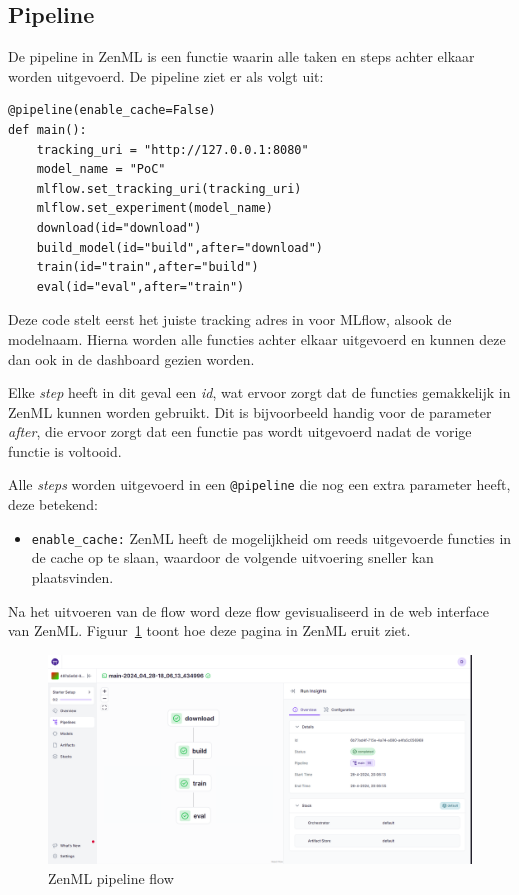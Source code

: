 \subsection{Pipeline}
De pipeline in ZenML is een functie waarin alle taken en steps achter elkaar worden uitgevoerd. De pipeline ziet er als volgt uit:
\begin{verbatim}
@pipeline(enable_cache=False)
def main():
    tracking_uri = "http://127.0.0.1:8080"
    model_name = "PoC"
    mlflow.set_tracking_uri(tracking_uri)
    mlflow.set_experiment(model_name)
    download(id="download")
    build_model(id="build",after="download")
    train(id="train",after="build")
    eval(id="eval",after="train")
\end{verbatim}
Deze code stelt eerst het juiste tracking adres in voor MLflow, alsook de modelnaam. Hierna worden alle functies achter elkaar uitgevoerd en kunnen deze dan ook in de dashboard gezien worden.

Elke \textit{step} heeft in dit geval een \textit{id}, wat ervoor zorgt dat de functies gemakkelijk in ZenML kunnen worden gebruikt. Dit is bijvoorbeeld handig voor de parameter \textit{after}, die ervoor zorgt dat een functie pas wordt uitgevoerd nadat de vorige functie is voltooid.

Alle \textit{steps} worden uitgevoerd in een \texttt{@pipeline} die nog een extra parameter heeft, deze betekend:

\begin{itemize}
    \item \texttt{enable\_cache:} ZenML heeft de mogelijkheid om reeds uitgevoerde functies in de cache op te slaan, waardoor de volgende uitvoering sneller kan plaatsvinden.
\end{itemize}

Na het uitvoeren van de flow word deze flow gevisualiseerd in de web interface van ZenML. Figuur~\ref{fig:ZenML_Pipeline_Flow} toont hoe deze pagina in ZenML eruit ziet.
\begin{figure}[h]
    \centering
    \includegraphics[width=0.9\linewidth]{graphics/ZenML_Pipeline_Flow.PNG}
    \caption{ZenML pipeline flow}
    \label{fig:ZenML_Pipeline_Flow}
\end{figure}
